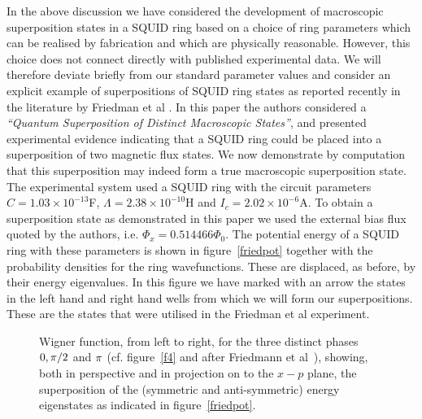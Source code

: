 \documentclass[12pt,a4paper,superscriptaddress,showpacs,floatfix,pra]{revtex4-2}
\begin{document}
In  the  above  discussion  we  have  considered  the  development  of
macroscopic superposition states in a  SQUID ring based on a choice of
ring parameters  which can  be realised by  fabrication and  which are
physically reasonable. However, this  choice does not connect directly
with published  experimental data.  We will therefore  deviate briefly
from our standard parameter values and consider an explicit example of
superpositions  of  SQUID ring  states  as  reported  recently in  the
literature by Friedman et  al \cite{FriedmanPCTL00}. In this paper the
authors  considered   a  \emph{``Quantum  Superposition   of  Distinct
Macroscopic States''}, and  presented experimental evidence indicating
that a SQUID ring could be placed into a superposition of two magnetic
flux states. We now demonstrate by computation that this superposition
may  indeed   form  a   true  macroscopic  superposition   state.  The
experimental  system used  a SQUID  ring with  the  circuit parameters
$C=1.03\times      10^{-13}$\textrm{F},      $\Lambda      =2.38\times
10^{-10}$\textrm{H}   and  $I_{c}=2.02\times   10^{-6}$\textrm{A}.  To
obtain a superposition state as demonstrated in this paper we used the
external bias flux quoted by the authors, i.e. $\Phi _{x}=0.514466\Phi
_{0}$. The potential  energy of a SQUID ring  with these parameters is
shown in figure~\ref{friedpot} together with the probability densities
for the ring  wavefunctions. These are displaced, as  before, by their
energy eigenvalues.  In this figure we  have marked with  an arrow the
states in the  left hand and right hand wells from  which we will form
our superpositions.  These are  the states that  were utilised  in the
Friedman et al experiment.

\begin{figure}[!t]
\begin{center}
\end{center}
\caption{Wigner function,  from left to right, for  the three distinct
phases       $0,\protect\pi/2$       and      $\protect\pi$       (cf.
figure~\protect\ref{f4}       and       after       Friedmann       et
al~\protect\cite{FriedmanPCTL00}), showing, both in perspective and in
projection on to the $x-p$  plane, the superposition of the (symmetric
and    anti-symmetric)   energy    eigenstates    as   indicated    in
figure~\protect\ref{friedpot}.}
\label{friedwig}
\end{figure}
\end{document}
